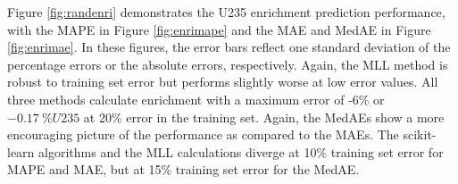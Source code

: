 Figure \ref{fig:randenri} demonstrates the \gls{U235} enrichment prediction
performance, with the \gls{MAPE} in Figure \ref{fig:enrimape} and the \gls{MAE}
and \gls{MedAE} in Figure \ref{fig:enrimae}. In these figures, the error bars
reflect one standard deviation of the percentage errors or the absolute errors,
respectively.  Again, the \gls{MLL} method is robust to training set error but
performs slightly worse at low error values.  All three methods calculate
enrichment with a maximum error of -6\% or $-0.17\:\%U235$ at 20\% error in the
training set. Again, the \gls{MedAE}s show a more encouraging picture of the
performance as compared to the \gls{MAE}s. The scikit-learn algorithms and the
\gls{MLL} calculations diverge at 10\% training set error for \gls{MAPE} and
\gls{MAE}, but at 15\% training set error for the \gls{MedAE}.

